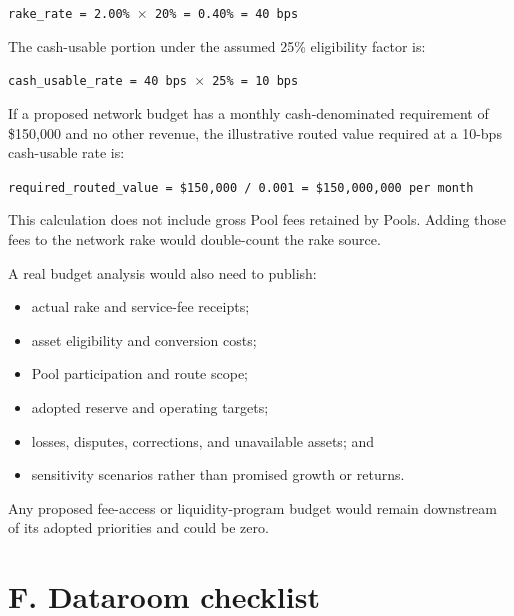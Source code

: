 \documentclass[11pt]{article}
\begin{document}
\texttt{rake\_rate = 2.00\% $\times$ 20\% = 0.40\% = 40 bps}

The cash-usable portion under the assumed 25\% eligibility factor is:

\texttt{cash\_usable\_rate = 40 bps $\times$ 25\% = 10 bps}

If a proposed network budget has a monthly cash-denominated requirement of \$150,000 and no other revenue, the illustrative routed value required at a 10-bps cash-usable rate is:

\texttt{required\_routed\_value = \$150,000 / 0.001 = \$150,000,000 per month}

This calculation does not include gross Pool fees retained by Pools. Adding those fees to the network rake would double-count the rake source.

A real budget analysis would also need to publish:

\begin{itemize}[leftmargin=*]
\item actual rake and service-fee receipts;
\item asset eligibility and conversion costs;
\item Pool participation and route scope;
\item adopted reserve and operating targets;
\item losses, disputes, corrections, and unavailable assets; and
\item sensitivity scenarios rather than promised growth or returns.
\end{itemize}
Any proposed fee-access or liquidity-program budget would remain downstream of its adopted priorities and could be zero.


\section*{F. Dataroom checklist}
\end{document}

